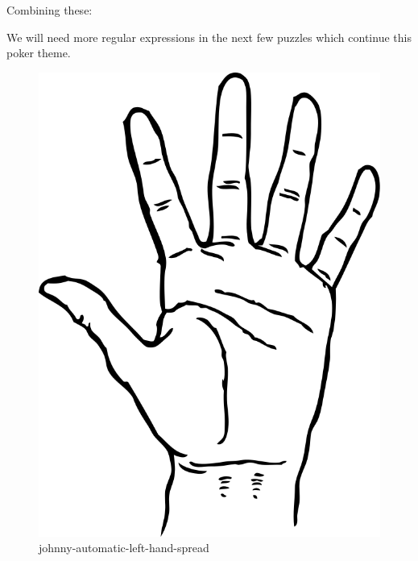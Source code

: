\newpage

Combining these:

\begin{Shaded}
\begin{Highlighting}[]
\OperatorTok{\textgreater{}\textgreater{}\textgreater{}}\NormalTok{))}
\end{Highlighting}
\end{Shaded}

We will need more regular expressions in the next few puzzles which
continue this poker theme.

\begin{figure}
\centering
\includegraphics{images/johnny-automatic-left-hand-spread.svg}
\caption{johnny-automatic-left-hand-spread}
\end{figure}

